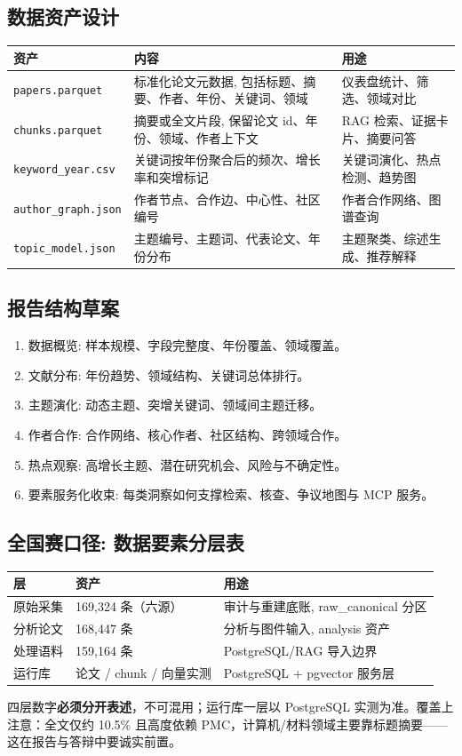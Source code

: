 \subsection{数据资产设计}

\begin{center}
\begin{tabularx}{\textwidth}{p{34mm}X X}
\toprule
资产 & 内容 & 用途 \\
\midrule
\texttt{papers.parquet} & 标准化论文元数据, 包括标题、摘要、作者、年份、关键词、领域 & 仪表盘统计、筛选、领域对比 \\
\texttt{chunks.parquet} & 摘要或全文片段, 保留论文 id、年份、领域、作者上下文 & RAG 检索、证据卡片、摘要问答 \\
\texttt{keyword\_year.csv} & 关键词按年份聚合后的频次、增长率和突增标记 & 关键词演化、热点检测、趋势图 \\
\texttt{author\_graph.json} & 作者节点、合作边、中心性、社区编号 & 作者合作网络、图谱查询 \\
\texttt{topic\_model.json} & 主题编号、主题词、代表论文、年份分布 & 主题聚类、综述生成、推荐解释 \\
\bottomrule
\end{tabularx}
\end{center}

\subsection{报告结构草案}

\begin{enumerate}
  \item 数据概览: 样本规模、字段完整度、年份覆盖、领域覆盖。
  \item 文献分布: 年份趋势、领域结构、关键词总体排行。
  \item 主题演化: 动态主题、突增关键词、领域间主题迁移。
  \item 作者合作: 合作网络、核心作者、社区结构、跨领域合作。
  \item 热点观察: 高增长主题、潜在研究机会、风险与不确定性。
  \item 要素服务化收束: 每类洞察如何支撑检索、核查、争议地图与 MCP 服务。
\end{enumerate}

\subsection{全国赛口径: 数据要素分层表}

\begin{center}
\begin{tabularx}{\textwidth}{p{30mm}X X}
\toprule
层 & 资产 & 用途 \\
\midrule
原始采集 & 169{,}324 条（六源） & 审计与重建底账, raw\_canonical 分区 \\
分析论文 & 168{,}447 条 & 分析与图件输入, analysis 资产 \\
处理语料 & 159{,}164 条 & PostgreSQL/RAG 导入边界 \\
运行库 & 论文 / chunk / 向量实测 & PostgreSQL + pgvector 服务层 \\
\bottomrule
\end{tabularx}
\end{center}

\begin{plainbox}
四层数字\textbf{必须分开表述}，不可混用；运行库一层以 PostgreSQL 实测为准。覆盖上注意：全文仅约
10.5\% 且高度依赖 PMC，计算机/材料领域主要靠标题摘要——这在报告与答辩中要诚实前置。
\end{plainbox}

\clearpage
